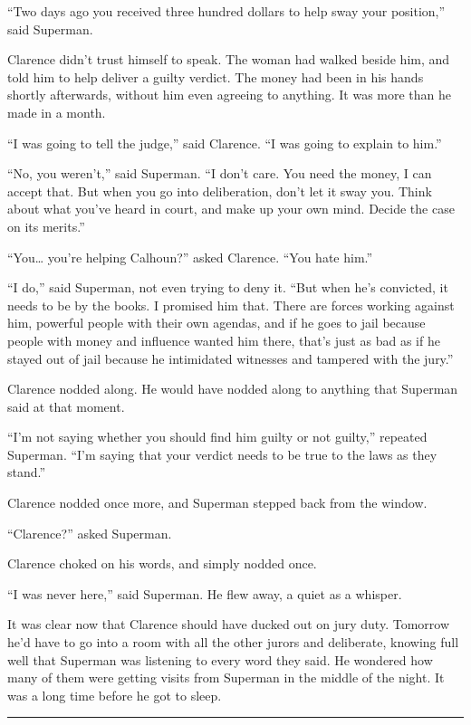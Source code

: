 \documentclass[ebook,12pt]{memoir}
\begin{document}
``Two days ago you received three hundred dollars to help sway your
position,'' said Superman.

Clarence didn't trust himself to speak. The woman had walked beside him,
and told him to help deliver a guilty verdict. The money had been in his
hands shortly afterwards, without him even agreeing to anything. It was
more than he made in a month.

``I was going to tell the judge,'' said Clarence. ``I was going to
explain to him.''

``No, you weren't,'' said Superman. ``I don't care. You need the money,
I can accept that. But when you go into deliberation, don't let it sway
you. Think about what you've heard in court, and make up your own mind.
Decide the case on its merits.''

``You\ldots{} you're helping Calhoun?'' asked Clarence. ``You hate
him.''

``I do,'' said Superman, not even trying to deny it. ``But when he's
convicted, it needs to be by the books. I promised him that. There are
forces working against him, powerful people with their own agendas, and
if he goes to jail because people with money and influence wanted him
there, that's just as bad as if he stayed out of jail because he
intimidated witnesses and tampered with the jury.''

Clarence nodded along. He would have nodded along to anything that
Superman said at that moment.

``I'm not saying whether you should find him guilty or not guilty,''
repeated Superman. ``I'm saying that your verdict needs to be true to
the laws as they stand.''

Clarence nodded once more, and Superman stepped back from the window.

``Clarence?'' asked Superman.

Clarence choked on his words, and simply nodded once.

``I was never here,'' said Superman. He flew away, a quiet as a whisper.

It was clear now that Clarence should have ducked out on jury duty.
Tomorrow he'd have to go into a room with all the other jurors and
deliberate, knowing full well that Superman was listening to every word
they said. He wondered how many of them were getting visits from
Superman in the middle of the night. It was a long time before he got to
sleep.

\begin{center}\rule{0.5\linewidth}{0.5pt}\end{center}
\end{document}
